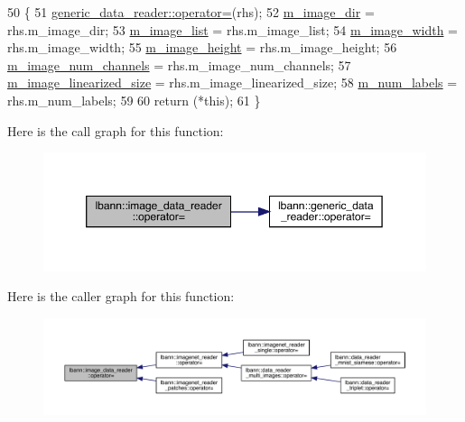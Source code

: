 \begin{DoxyCode}
50                                                                             \{
51   \hyperlink{classlbann_1_1generic__data__reader_aec7e626e6efa2a4bf23f931e2ef8f607}{generic\_data\_reader::operator=}(rhs);
52   \hyperlink{classlbann_1_1image__data__reader_ab1289f0207f3a9989c7b28e09a23c9a3}{m\_image\_dir} = rhs.m\_image\_dir;
53   \hyperlink{classlbann_1_1image__data__reader_ae3fc949bd08c45ceafb1a03503261008}{m\_image\_list} = rhs.m\_image\_list;
54   \hyperlink{classlbann_1_1image__data__reader_af001f3d1c0f1c580b66988233b3a64f0}{m\_image\_width} = rhs.m\_image\_width;
55   \hyperlink{classlbann_1_1image__data__reader_a0632efa3deaa9d61e671f741909eb3fe}{m\_image\_height} = rhs.m\_image\_height;
56   \hyperlink{classlbann_1_1image__data__reader_aab1a440f361521dc7bd583cefe1061f8}{m\_image\_num\_channels} = rhs.m\_image\_num\_channels;
57   \hyperlink{classlbann_1_1image__data__reader_af512f1f866c0f654309b7f28886dca9a}{m\_image\_linearized\_size} = rhs.m\_image\_linearized\_size;
58   \hyperlink{classlbann_1_1image__data__reader_af280e8758a6ec3acee7c62e6351d17e0}{m\_num\_labels} = rhs.m\_num\_labels;
59 
60   \textcolor{keywordflow}{return} (*\textcolor{keyword}{this});
61 \}
\end{DoxyCode}
Here is the call graph for this function\+:\nopagebreak
\begin{figure}[H]
\begin{center}
\leavevmode
\includegraphics[width=350pt]{classlbann_1_1image__data__reader_a76a0b52eafb9ad133fb45fec7cf44700_cgraph}
\end{center}
\end{figure}
Here is the caller graph for this function\+:\nopagebreak
\begin{figure}[H]
\begin{center}
\leavevmode
\includegraphics[width=350pt]{classlbann_1_1image__data__reader_a76a0b52eafb9ad133fb45fec7cf44700_icgraph}
\end{center}
\end{figure}
\mbox{\label{classlbann_1_1image__data__reader_a71e4fa1eb8212cce88a2ed408ceeac51}} 
